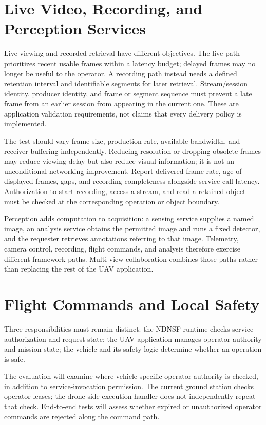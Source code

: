 \section{Live Video, Recording, and Perception Services}
Live viewing and recorded retrieval have different objectives. The live path prioritizes recent usable frames within a latency budget; delayed frames may no longer be useful to the operator. A recording path instead needs a defined retention interval and identifiable segments for later retrieval. Stream/session identity, producer identity, and frame or segment sequence must prevent a late frame from an earlier session from appearing in the current one. These are application validation requirements, not claims that every delivery policy is implemented.

The test should vary frame size, production rate, available bandwidth, and receiver buffering independently. Reducing resolution or dropping obsolete frames may reduce viewing delay but also reduce visual information; it is not an unconditional networking improvement. Report delivered frame rate, age of displayed frames, gaps, and recording completeness alongside service-call latency. Authorization to start recording, access a stream, and read a retained object must be checked at the corresponding operation or object boundary.

Perception adds computation to acquisition: a sensing service supplies a named image, an analysis service obtains the permitted image and runs a fixed detector, and the requester retrieves annotations referring to that image. Telemetry, camera control, recording, flight commands, and analysis therefore exercise different framework paths. Multi-view collaboration combines those paths rather than replacing the rest of the UAV application.

\section{Flight Commands and Local Safety}

Three responsibilities must remain distinct: the NDNSF runtime checks service authorization and request state; the UAV application manages operator authority and mission state; the vehicle and its safety logic determine whether an operation is safe.

The evaluation will examine where vehicle-specific operator authority is checked, in addition to service-invocation permission. The current ground station checks operator leases; the drone-side execution handler does not independently repeat that check. End-to-end tests will assess whether expired or unauthorized operator commands are rejected along the command path.

